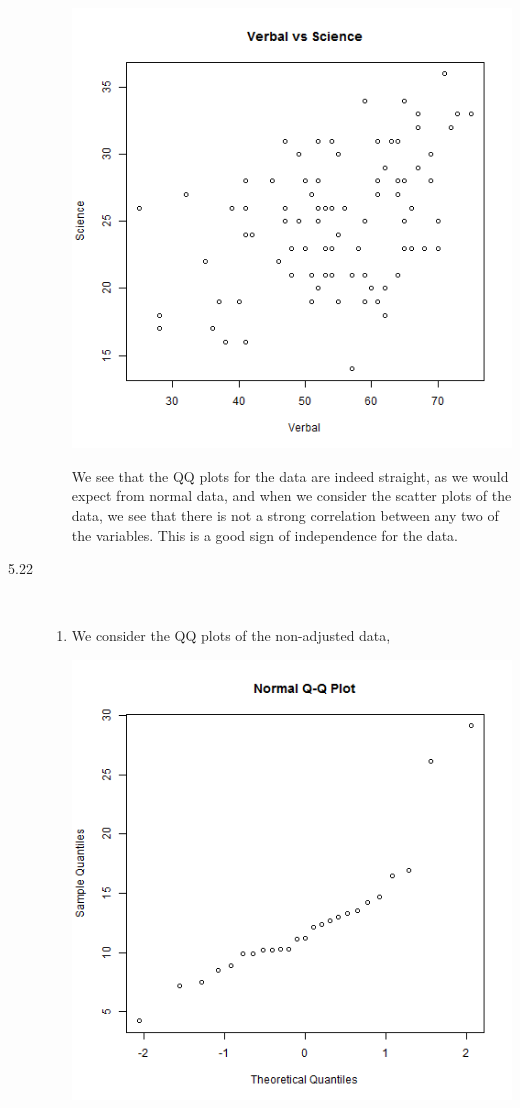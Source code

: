 \documentclass[letterpaper,10pt]{article}
\begin{document}
\begin{description}
\begin{enumerate}
\begin{center}
\includegraphics[scale=.33]{VerbalvScience.png}
\end{center}
We see that the QQ plots for the data are indeed straight, as we would expect from normal data, and when we consider the scatter plots of the data, we see that there is not a strong correlation between any two of the variables. This is a good sign of independence for the data.
\end{enumerate}
\item[5.22]\hfill\\
\begin{enumerate}
\item We consider the QQ plots of the non-adjusted data,
\begin{center}
\includegraphics[scale=.33]{QQFuel.png}

\end{center}
\end{enumerate}
\end{description}
\end{document}
